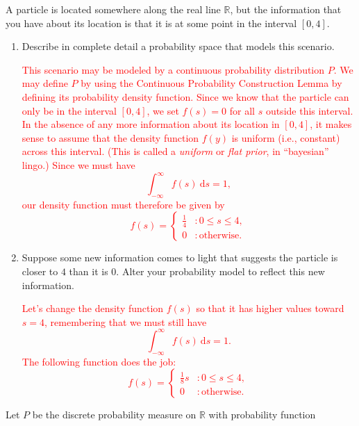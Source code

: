 \documentclass[12pt,reqno]{amsart}
\begin{document}
\bigskip
\prob A particle is located somewhere along the real line $\mathbb{R}$, but the  information that you have about its location is that it is at some point in the interval $[0,4]$.

\medskip
\begin{enumerate}
\item Describe in complete detail a probability space that models this scenario.

\bigskip
\textcolor{red}{This scenario may be modeled by a continuous probability distribution $P$. We may define $P$ by using the Continuous Probability Construction Lemma by defining its probability density function. Since we know that the particle can only be in the interval $[0,4]$, we set $f(s)=0$ for all $s$ outside this interval. In the absence of any more information about its location in $[0,4]$, it makes sense to assume that the density function $f(y)$ is uniform (i.e., constant) across this interval. (This is called a \textit{uniform} or \textit{flat prior}, in ``bayesian'' lingo.) Since we must have
	\[
	\int_{-\infty}^\infty f(s) \ \text{d} s=1,
	\]
our density function must therefore be given by
	\[
	f(s) = \begin{cases}
	\frac{1}{4} & : 0 \leq s \leq 4, \\
	0 & : \text{otherwise}.
	\end{cases}
	\]}
\bigskip

\item Suppose some new information comes to light that suggests the particle is closer to $4$ than it is $0$. Alter your probability model to reflect this new information.
    
\bigskip
\textcolor{red}{Let's change the density function $f(s)$ so that it has higher values toward $s=4$, remembering that we must still have
	\[
	\int_{-\infty}^\infty f(s) \ \text{d} s = 1.
	\]
The following function does the job:
	\[
	f(s) = \begin{cases}
	\frac{1}{8}s & : 0 \leq s \leq 4, \\
	0 & : \text{otherwise}.
	\end{cases}
	\]}
\end{enumerate}
    













\bigskip
\prob Let $P$ be the discrete probability measure on $\mathbb{R}$ with probability function
\end{document}
